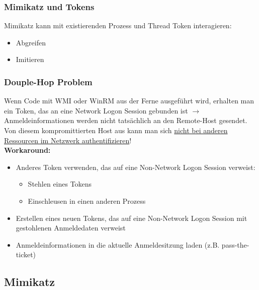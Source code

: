 \subsubsection{Mimikatz und Tokens}
Mimikatz kann mit existierenden Prozess und Thread Token interagieren:
\begin{itemize}
    \item Abgreifen
    \item Imitieren
\end{itemize}

\subsubsection{Douple-Hop Problem}
Wenn Code mit WMI oder WinRM aus der Ferne ausgeführt wird, erhalten man ein Token, das an eine Network Logon Session gebunden ist $\rightarrow$ Anmeldeinformationen werden nicht tatsächlich an den Remote-Host gesendet.\\
Von diesem kompromittierten Host aus kann man sich \underline{nicht bei anderen Ressourcen im Netzwerk authentifizieren}!\\
\textbf{Workaround:}
\begin{itemize}
    \item Anderes Token verwenden, das auf eine Non-Network Logon Session verweist:
    \begin{itemize}
        \item Stehlen eines Tokens
        \item Einschleusen in einen anderen Prozess
    \end{itemize}
    \item Erstellen eines neuen Tokens, das auf eine Non-Network Logon Session mit gestohlenen Anmeldedaten verweist
    \item Anmeldeinformationen in die aktuelle Anmeldesitzung laden (z.B. pass-the-ticket)
\end{itemize}

\subsection{Mimikatz}

